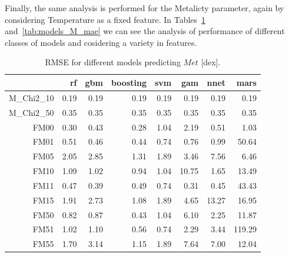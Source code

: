 { 

Finally, the same analysis is performed for the Metalicty parameter, 
again by considering Temperature as a fixed feature.
In Tables~\ref{tab:models_M_rmse} and~\ref{tab:models_M_mae} 
we can see the analysis of performance of different classes of
models and cosidering a variety in features.

\begin{table}[ht]
\centering
\begin{tabular}{rrrrrrrr}
  \hline
 & rf & gbm & boosting & svm & gam & nnet & mars \\ 
  \hline
M\_Chi2\_10 & 0.19 & 0.19 & 0.19 & 0.19 & 0.19 & 0.19 & 0.19 \\ 
 M\_Chi2\_50 & 0.35 & 0.35 & 0.35 & 0.35 & 0.35 & 0.35 & 0.35 \\ 
  FM00 & 0.30 & 0.43 & 0.28 & 1.04 & 2.19 & 0.51 & 1.03 \\ 
  FM01 & 0.51 & 0.46 & 0.44 & 0.74 & 0.76 & 0.99 & 50.64 \\ 
  FM05 & 2.05 & 2.85 & 1.31 & 1.89 & 3.46 & 7.56 & 6.46 \\ 
  FM10 & 1.09 & 1.02 & 0.94 & 1.04 & 10.75 & 1.65 & 13.49 \\ 
  FM11 & 0.47 & 0.39 & 0.49 & 0.74 & 0.31 & 0.45 & 43.43 \\ 
  FM15 & 1.91 & 2.73 & 1.08 & 1.89 & 4.65 & 13.27 & 16.95 \\ 
  FM50 & 0.82 & 0.87 & 0.43 & 1.04 & 6.10 & 2.25 & 11.87 \\ 
  FM51 & 1.02 & 1.10 & 0.56 & 0.74 & 2.29 & 3.44 & 119.29 \\ 
  FM55 & 1.70 & 3.14 & 1.15 & 1.89 & 7.64 & 7.00 & 12.04 \\ 
   \hline
   \end{tabular}
\caption { RMSE for different models predicting $Met$ [dex].} 
\label{tab:models_M_rmse} 
\end{table}
   


}
